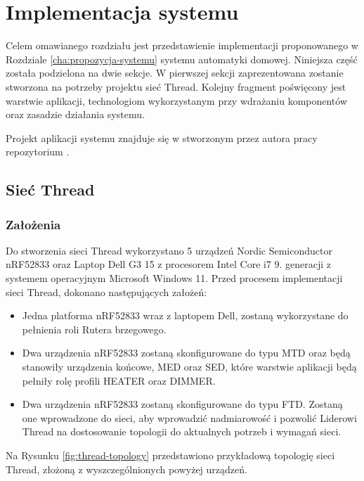 \chapter{Implementacja systemu}
\label{cha:implementacja}

Celem omawianego rozdziału jest przedstawienie implementacji proponowanego w Rozdziale \ref{cha:propozycja-systemu} systemu automatyki domowej. Niniejsza część została podzielona na dwie sekcje. W pierwszej sekcji zaprezentowana zostanie stworzona na potrzeby projektu sieć Thread. Kolejny fragment poświęcony jest warstwie aplikacji, technologiom wykorzystanym przy wdrażaniu komponentów oraz zasadzie działania systemu.

Projekt aplikacji systemu znajduje się w stworzonym przez autora pracy repozytorium \cite{project-repo}.

\section{Sieć Thread}

    \subsection{Założenia}
    \label{sec:thread-network-assumptions}
    
        Do stworzenia sieci Thread wykorzystano 5 urządzeń Nordic Semiconductor nRF52833 oraz Laptop Dell G3 15 z procesorem Intel Core i7 9. generacji z systemem operacyjnym Microsoft Windows 11. Przed procesem implementacji sieci Thread, dokonano następujących założeń:
        \begin{itemize}
            \item Jedna platforma nRF52833 wraz z laptopem Dell, zostaną wykorzystane do pełnienia roli Rutera brzegowego.
            \item Dwa urządzenia nRF52833 zostaną skonfigurowane do typu MTD oraz będą stanowiły urządzenia końcowe, MED oraz SED, które warstwie aplikacji będą pełniły rolę profili HEATER oraz DIMMER.
            \item Dwa urządzenia nRF52833 zostaną skonfigurowane do typu FTD. Zostaną one wprowadzone do sieci, aby wprowadzić nadmiarowość i pozwolić Liderowi Thread na dostosowanie topologii do aktualnych potrzeb i wymagań sieci.
        \end{itemize}

        Na Rysunku \ref{fig:thread-topology} przedstawiono przykładową topologię sieci Thread, złożoną z wyszczególnionych powyżej urządzeń.

